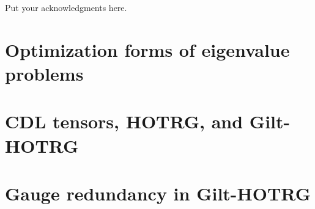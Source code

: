\documentclass[aps,prb,reprint,superscriptaddress]{revtex4-2}
\begin{document}
\begin{acknowledgments}
Put your acknowledgments here.

\blindtext
\end{acknowledgments}

\appendix
\section{Optimization forms of eigenvalue problems\label{appd:opteig}}
\blindtext
\section{CDL tensors, HOTRG, and Gilt-HOTRG\label{appd:cdlHOTRG}}
\blindtext
\section{Gauge redundancy in Gilt-HOTRG\label{appd:gaugeFix}}
\blindtext



\end{document}
